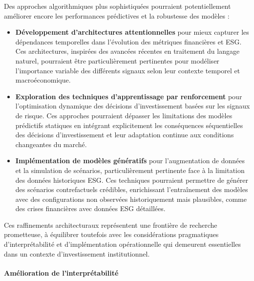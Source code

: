 Des approches algorithmiques plus sophistiquées pourraient potentiellement améliorer encore les performances prédictives et la robustesse des modèles :
\begin{itemize}
    \item \textbf{Développement d'architectures attentionnelles} pour mieux capturer les dépendances temporelles dans l'évolution des métriques financières et ESG. Ces architectures, inspirées des avancées récentes en traitement du langage naturel, pourraient être particulièrement pertinentes pour modéliser l'importance variable des différents signaux selon leur contexte temporel et macroéconomique.
    
    \item \textbf{Exploration des techniques d'apprentissage par renforcement} pour l'optimisation dynamique des décisions d'investissement basées sur les signaux de risque. Ces approches pourraient dépasser les limitations des modèles prédictifs statiques en intégrant explicitement les conséquences séquentielles des décisions d'investissement et leur adaptation continue aux conditions changeantes du marché.
    
    \item \textbf{Implémentation de modèles génératifs} pour l'augmentation de données et la simulation de scénarios, particulièrement pertinente face à la limitation des données historiques ESG. Ces techniques pourraient permettre de générer des scénarios contrefactuels crédibles, enrichissant l'entraînement des modèles avec des configurations non observées historiquement mais plausibles, comme des crises financières avec données ESG détaillées.
\end{itemize}

Ces raffinements architecturaux représentent une frontière de recherche prometteuse, à équilibrer toutefois avec les considérations pragmatiques d'interprétabilité et d'implémentation opérationnelle qui demeurent essentielles dans un contexte d'investissement institutionnel.

\paragraph{Amélioration de l'interprétabilité} 


